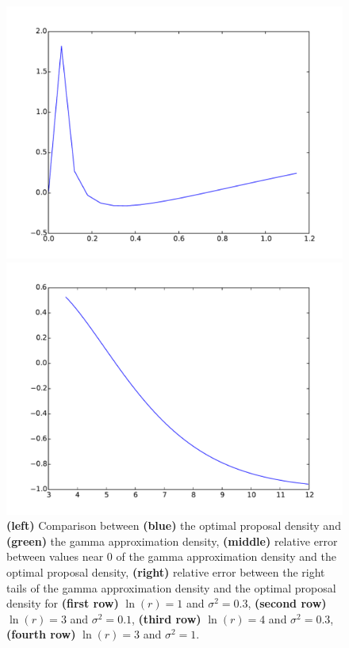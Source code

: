 \documentclass{article}
\begin{document}
\begin{figure}[htb]
\begin{minipage}{.3\textwidth}
	\end{minipage}
	\begin{minipage}{.3\textwidth}
		\centering
		\includegraphics[width=0.97\linewidth]{bootstrap-filter/relative_beginning_simple_3_10.pdf}
	\end{minipage}
	\begin{minipage}{.3\textwidth}
		\centering
		\includegraphics[width=0.97\linewidth]{bootstrap-filter/relative_tail_simple_3_10.pdf}
	\end{minipage}
	\caption{\textbf{(left)} Comparison between \textbf{(blue)} the optimal proposal density and \textbf{(green)} the gamma approximation density, \textbf{(middle)} relative error between values near 0 of the gamma approximation density and the optimal proposal density, \textbf{(right)} relative error between the right tails of the gamma approximation density and the optimal proposal density for \textbf{(first row)} $\ln(r)=1$ and $\sigma^2 = 0.3$, \textbf{(second row)} $\ln(r)=3$ and $\sigma^2 = 0.1$, \textbf{(third row)} $\ln(r)=4$ and $\sigma^2 = 0.3$, \textbf{(fourth row)} $\ln(r)=3$ and $\sigma^2 = 1$.}
	\label{fig:movingsimple}
\end{figure}
\end{document}
